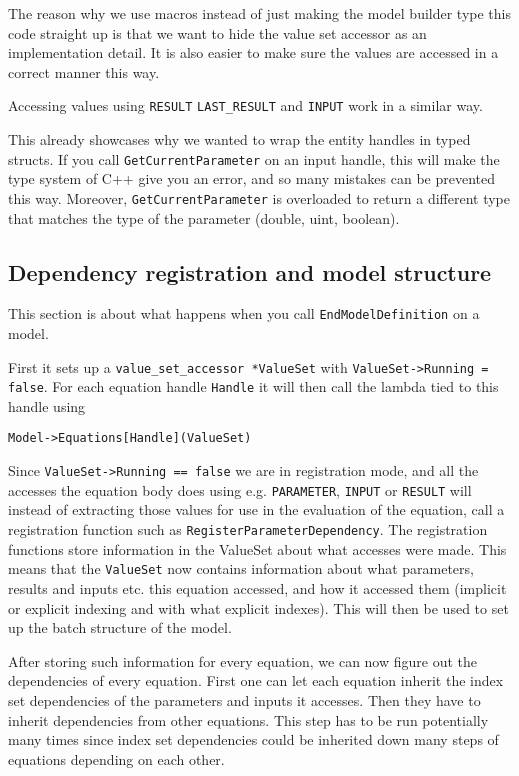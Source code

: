 \documentclass[11pt]{article}
\theoremstyle{definition}
\begin{document}
The reason why we use macros instead of just making the model builder type this code straight up is that we want to hide the value set accessor as an implementation detail. It is also easier  to make sure the values are accessed in a correct manner this way.

Accessing values using {\tt RESULT} {\tt LAST\_RESULT} and {\tt INPUT} work in a similar way.

This already showcases why we wanted to wrap the entity handles in typed structs. If you call {\tt GetCurrentParameter} on an input handle, this will make the type system of C++ give you an error, and so many mistakes can be prevented this way. Moreover, {\tt GetCurrentParameter} is overloaded to return a different type that matches the type of the parameter (double, uint, boolean).

\subsection{Dependency registration and model structure}

This section is about what happens when you call {\tt EndModelDefinition} on a model.

First it sets up a {\tt value\_set\_accessor *ValueSet} with {\tt ValueSet->Running = false}. For each equation handle {\tt Handle} it will then call the lambda tied to this handle using
\begin{lstlisting}[style=mycpp]
Model->Equations[Handle](ValueSet)
\end{lstlisting}
Since {\tt ValueSet->Running == false} we are in registration mode, and all the accesses the equation body does using e.g. {\tt PARAMETER}, {\tt INPUT} or {\tt RESULT} will instead of extracting those values for use in the evaluation of the equation, call a registration function such as {\tt RegisterParameterDependency}. The registration functions store information in the ValueSet about what accesses were made. This means that the {\tt ValueSet} now contains information about what parameters, results and inputs etc. this equation accessed, and how it accessed them (implicit or explicit indexing and with what explicit indexes). This will then be used to set up the batch structure of the model.

After storing such information for every equation, we can now figure out the dependencies of every equation. First one can let each equation inherit the index set dependencies of the parameters and inputs it accesses. Then they have to inherit dependencies from other equations. This step has to be run potentially many times since index set dependencies could be inherited down many steps of equations depending on each other.
\end{document}
